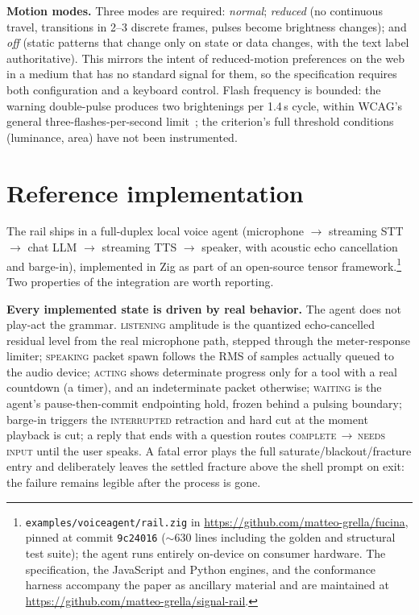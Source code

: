 \documentclass[11pt]{article}
\newcommand{\railstate}[1]{\textsc{#1}}
\begin{document}
\textbf{Motion modes.} Three modes are required: \emph{normal};
\emph{reduced} (no continuous travel, transitions in 2--3 discrete
frames, pulses become brightness changes); and \emph{off} (static
patterns that change only on state or data changes, with the text label
authoritative). This mirrors the intent of reduced-motion preferences on
the web~\cite{wcag21} in a medium that has no standard signal for them,
so the specification requires both configuration and a keyboard control.
Flash frequency is bounded: the warning double-pulse produces two
brightenings per 1.4\,s cycle, within WCAG's general
three-flashes-per-second limit~\cite{wcag21}; the criterion's full
threshold conditions (luminance, area) have not been instrumented.

\section{Reference implementation}
\label{sec:implementation}

The rail ships in a full-duplex local voice agent (microphone
$\rightarrow$ streaming STT $\rightarrow$ chat LLM $\rightarrow$ streaming
TTS $\rightarrow$ speaker, with acoustic echo cancellation and barge-in),
implemented in Zig as part of an open-source tensor
framework.\footnote{\texttt{examples/voiceagent/rail.zig} in
\url{https://github.com/matteo-grella/fucina}, pinned at commit
\texttt{9c24016} (${\sim}630$ lines including the golden and
structural test suite); the agent runs entirely on-device on consumer
hardware. The specification, the JavaScript and Python engines, and the
conformance harness accompany the paper as ancillary material and are
maintained at \url{https://github.com/matteo-grella/signal-rail}.} Two properties of the integration are worth reporting.

\textbf{Every implemented state is driven by real behavior.} The agent does not
play-act the grammar. \railstate{listening} amplitude is the quantized
echo-cancelled residual level from the real microphone path, stepped
through the meter-response limiter; \railstate{speaking} packet spawn
follows the RMS of samples actually queued to the audio device;
\railstate{acting} shows determinate progress only for a tool with a real
countdown (a timer), and an indeterminate packet otherwise;
\railstate{waiting} is the agent's pause-then-commit endpointing hold,
frozen behind a pulsing boundary; barge-in triggers the
\railstate{interrupted} retraction and hard cut at the moment playback is
cut; a reply that ends with a question routes
\railstate{complete}\,$\rightarrow$\,\railstate{needs input} until the
user speaks. A fatal error plays the full saturate/blackout/fracture
entry and deliberately leaves the settled fracture above the shell prompt on exit: the failure remains legible after the process is gone.
\end{document}

